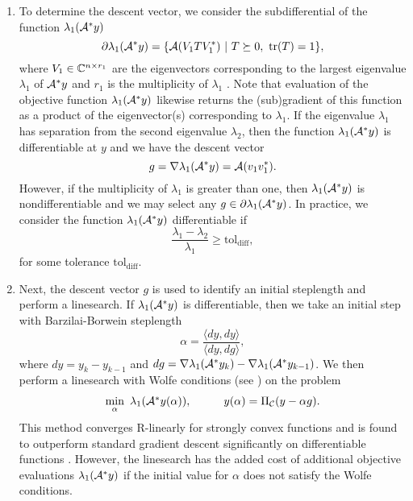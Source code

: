 \begin{enumerate}
\item

To determine the descent vector, we consider the subdifferential of the function $ \lambda_1({\mathcal A}^*y)$ 
\begin{equation} 		\label{Eqn:GD-subdifferential}
\partial \lambda_1({\mathcal A}^* y) = \{  {\mathcal A}(V_1 T V_1^*) \ | \ T \succeq 0, \ \mathrm{tr}(T) = 1 \},
\end{equation}
where $V_1 \in {\mathbb C}^{n \times r_1}$ are the eigenvectors corresponding to the largest eigenvalue $\lambda_1$ of ${\mathcal A}^* y$ and $r_1$ is the multiplicity of $\lambda_1$ \cite[Section 6.7]{parikh2014proximal}.  Note that evaluation of the objective function $\lambda_1({\mathcal A}^* y)$ likewise returns the (sub)gradient of this function as a product of the eigenvector(s) corresponding to $\lambda_1$.  If the eigenvalue $\lambda_1$ has separation from the second eigenvalue $\lambda_2$, then the function $\lambda_1({\mathcal A}^* y)$ is differentiable at $y$ and we have the descent vector
\begin{equation} 			\label{Eqn:GD-gradient}
g = \nabla \lambda_1({\mathcal A}^* y) = {\mathcal A}(v_1 v_1^*).
\end{equation}
However, if the multiplicity of $\lambda_1$ is greater than one, then $\lambda_1({\mathcal A}^*y)$ is nondifferentiable and we may select any $g \in \partial \lambda_1({\mathcal A}^*y)$.  In practice, we consider the function $\lambda_1({\mathcal A}^* y)$ differentiable if 
\begin{equation} 				\label{Eqn:GD-diff_tol}
\frac{\lambda_1 - \lambda_2}{\lambda_1} \geq \text{tol}_\text{diff},
\end{equation}
for some tolerance $\text{tol}_\text{diff}$.


\item
Next, the descent vector $g$ is used to identify an initial steplength and perform a linesearch.  If $\lambda_1({\mathcal A}^* y)$ is differentiable, then we take an initial step with Barzilai-Borwein steplength  \cite{barzilai1988twopoint}
\begin{equation}   			\label{Eqn:Barzilai-Borwein_steplength}
\alpha = \frac{\langle dy, dy \rangle}{\langle dy, dg \rangle},
\end{equation}
where $dy = y_k - y_{k-1}$ and $dg = \nabla \lambda_1({\mathcal A}^* y_k) -  \nabla \lambda_1({\mathcal A}^* y_{k-1}) $.  We then perform a linesearch with Wolfe conditions (see \cite[Section 3.1]{nocedal2006numerical}) on the problem
\begin{equation} 				\label{Eqn:GD-linesearch}
\begin{array}{lr}
\min\limits_\alpha \ \lambda_1({\mathcal A}^*y(\alpha)),
	 	\hspace{1cm} y(\alpha) = \Pi_{\mathcal C} (y - \alpha g).
\end{array}
\end{equation}
This method converges R-linearly for strongly convex functions and is found to outperform standard gradient descent significantly on differentiable functions \cite{zhang2004nonmonotone}.  However, the linesearch has the added cost of additional objective evaluations $\lambda_1({\mathcal A}^* y)$ if the initial value for $\alpha$ does not satisfy the Wolfe conditions.







\end{enumerate}
